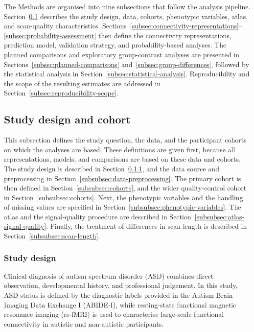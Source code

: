 The Methods are organised into nine subsections that follow the analysis pipeline. Section~\ref{subsec:study-design-cohort} describes the study design, data, cohorts, phenotypic variables, atlas, and scan-quality characteristics. Sections~\ref{subsec:connectivity-representations}--\ref{subsec:probability-assessment} then define the connectivity representations, prediction model, validation strategy, and probability-based analyses. The planned comparisons and exploratory group-contrast analyses are presented in Sections~\ref{subsec:planned-comparisons} and~\ref{subsec:group-differences}, followed by the statistical analysis in Section~\ref{subsec:statistical-analysis}. Reproducibility and the scope of the resulting estimates are addressed in Section~\ref{subsec:reproducibility-scope}.


\subsection{Study design and cohort}
\label{subsec:study-design-cohort}

This subsection defines the study question, the data, and the participant cohorts on which
the analyses are based. These definitions are given first, because all representations,
models, and comparisons are based on these data and cohorts. The study design is
described in Section~\ref{subsubsec:study-design}, and the data source and preprocessing in
Section~\ref{subsubsec:data-preprocessing}. The primary cohort is then defined in
Section~\ref{subsubsec:cohorts}, and the wider quality-control cohort in Section~\ref{subsubsec:cohorts}.
Next, the phenotypic variables and the handling of missing values are specified in
Section~\ref{subsubsec:phenotypic-variables}. The atlas and the signal-quality procedure are described in
Section~\ref{subsubsec:atlas-signal-quality}. Finally, the treatment of differences in scan length is described
in Section~\ref{subsubsec:scan-length}.

\subsubsection{Study design}
\label{subsubsec:study-design}

Clinical diagnosis of autism spectrum disorder (ASD) combines direct observation,
developmental history, and professional judgement. In this study, ASD status is defined by
the diagnostic labels provided in the Autism Brain Imaging Data Exchange I (ABIDE-I), while
resting-state functional magnetic resonance imaging (rs-fMRI) is used to characterise
large-scale functional connectivity in autistic and non-autistic participants.

